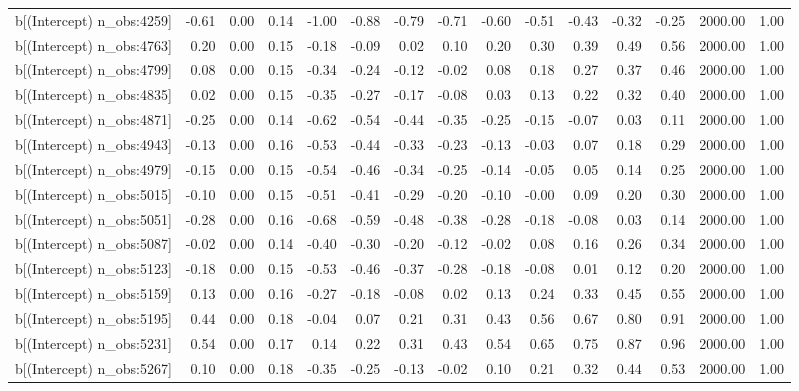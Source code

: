 \begin{table}[ht]
\begin{tabular}{rrrrrrrrrrrrrrr}
  b[(Intercept) n\_obs:4259] & -0.61 & 0.00 & 0.14 & -1.00 & -0.88 & -0.79 & -0.71 & -0.60 & -0.51 & -0.43 & -0.32 & -0.25 & 2000.00 & 1.00 \\ 
  b[(Intercept) n\_obs:4763] & 0.20 & 0.00 & 0.15 & -0.18 & -0.09 & 0.02 & 0.10 & 0.20 & 0.30 & 0.39 & 0.49 & 0.56 & 2000.00 & 1.00 \\ 
  b[(Intercept) n\_obs:4799] & 0.08 & 0.00 & 0.15 & -0.34 & -0.24 & -0.12 & -0.02 & 0.08 & 0.18 & 0.27 & 0.37 & 0.46 & 2000.00 & 1.00 \\ 
  b[(Intercept) n\_obs:4835] & 0.02 & 0.00 & 0.15 & -0.35 & -0.27 & -0.17 & -0.08 & 0.03 & 0.13 & 0.22 & 0.32 & 0.40 & 2000.00 & 1.00 \\ 
  b[(Intercept) n\_obs:4871] & -0.25 & 0.00 & 0.14 & -0.62 & -0.54 & -0.44 & -0.35 & -0.25 & -0.15 & -0.07 & 0.03 & 0.11 & 2000.00 & 1.00 \\ 
  b[(Intercept) n\_obs:4943] & -0.13 & 0.00 & 0.16 & -0.53 & -0.44 & -0.33 & -0.23 & -0.13 & -0.03 & 0.07 & 0.18 & 0.29 & 2000.00 & 1.00 \\ 
  b[(Intercept) n\_obs:4979] & -0.15 & 0.00 & 0.15 & -0.54 & -0.46 & -0.34 & -0.25 & -0.14 & -0.05 & 0.05 & 0.14 & 0.25 & 2000.00 & 1.00 \\ 
  b[(Intercept) n\_obs:5015] & -0.10 & 0.00 & 0.15 & -0.51 & -0.41 & -0.29 & -0.20 & -0.10 & -0.00 & 0.09 & 0.20 & 0.30 & 2000.00 & 1.00 \\ 
  b[(Intercept) n\_obs:5051] & -0.28 & 0.00 & 0.16 & -0.68 & -0.59 & -0.48 & -0.38 & -0.28 & -0.18 & -0.08 & 0.03 & 0.14 & 2000.00 & 1.00 \\ 
  b[(Intercept) n\_obs:5087] & -0.02 & 0.00 & 0.14 & -0.40 & -0.30 & -0.20 & -0.12 & -0.02 & 0.08 & 0.16 & 0.26 & 0.34 & 2000.00 & 1.00 \\ 
  b[(Intercept) n\_obs:5123] & -0.18 & 0.00 & 0.15 & -0.53 & -0.46 & -0.37 & -0.28 & -0.18 & -0.08 & 0.01 & 0.12 & 0.20 & 2000.00 & 1.00 \\ 
  b[(Intercept) n\_obs:5159] & 0.13 & 0.00 & 0.16 & -0.27 & -0.18 & -0.08 & 0.02 & 0.13 & 0.24 & 0.33 & 0.45 & 0.55 & 2000.00 & 1.00 \\ 
  b[(Intercept) n\_obs:5195] & 0.44 & 0.00 & 0.18 & -0.04 & 0.07 & 0.21 & 0.31 & 0.43 & 0.56 & 0.67 & 0.80 & 0.91 & 2000.00 & 1.00 \\ 
  b[(Intercept) n\_obs:5231] & 0.54 & 0.00 & 0.17 & 0.14 & 0.22 & 0.31 & 0.43 & 0.54 & 0.65 & 0.75 & 0.87 & 0.96 & 2000.00 & 1.00 \\ 
  b[(Intercept) n\_obs:5267] & 0.10 & 0.00 & 0.18 & -0.35 & -0.25 & -0.13 & -0.02 & 0.10 & 0.21 & 0.32 & 0.44 & 0.53 & 2000.00 & 1.00 \\ 

\end{tabular}
\end{table}

